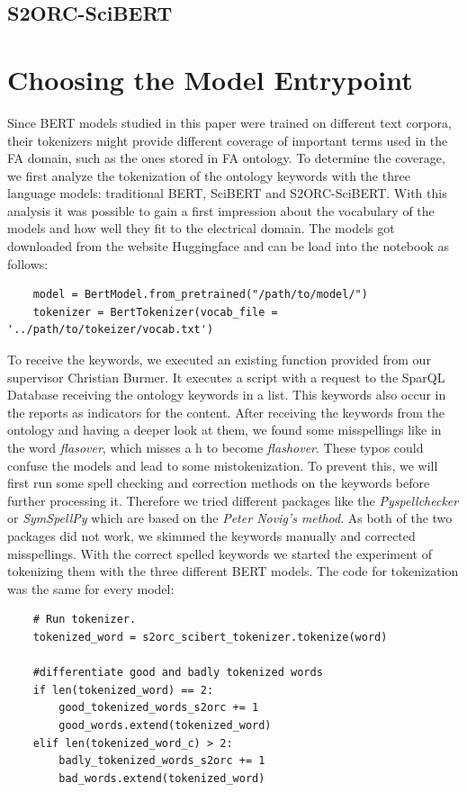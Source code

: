 \subsection{S2ORC-SciBERT}

\section{Choosing the Model Entrypoint}
Since BERT models studied in this paper were trained on different text corpora, their tokenizers might provide different coverage of important terms used in the FA domain, such as the ones stored in FA ontology. To determine the coverage, we first analyze the tokenization of the ontology keywords with the three language models: traditional BERT, SciBERT and S2ORC-SciBERT. With this analysis it was possible to gain a first impression about the vocabulary of the models and how well they fit to the electrical domain. \newline
The models got downloaded from the website \alert{Huggingface} and can be load into the notebook as follows:
\begin{verbatim}
	model = BertModel.from_pretrained("/path/to/model/")
	tokenizer = BertTokenizer(vocab_file = '../path/to/tokeizer/vocab.txt')
\end{verbatim}

To receive the keywords, we executed an existing function provided from our supervisor Christian Burmer. It executes a script with a request to the SparQL Database receiving the ontology keywords in a list. This keywords also occur in the reports as indicators for the content. \newline
After receiving the keywords from the ontology and having a deeper look at them, we found some misspellings like in the word \textit{flasover}, which misses a h to become \textit{flashover}. These typos could confuse the models and lead to some mistokenization. To prevent this, we will first run some spell checking and correction methods on the keywords before further processing it. Therefore we tried different packages like the \textit{Pyspellchecker} or \textit{SymSpellPy} which are based on the \textit\alert{{Peter Novig's method}}. As both of the two packages did not work, we skimmed the keywords manually and corrected misspellings. \newline
With the correct spelled keywords we started the experiment of tokenizing them with the three different BERT models. The code for tokenization was the same for every model:
\begin{verbatim}
	# Run tokenizer.
	tokenized_word = s2orc_scibert_tokenizer.tokenize(word)
	
	#differentiate good and badly tokenized words
	if len(tokenized_word) == 2:
		good_tokenized_words_s2orc += 1
		good_words.extend(tokenized_word) 
	elif len(tokenized_word_c) > 2:
		badly_tokenized_words_s2orc += 1
		bad_words.extend(tokenized_word)
\end{verbatim}

